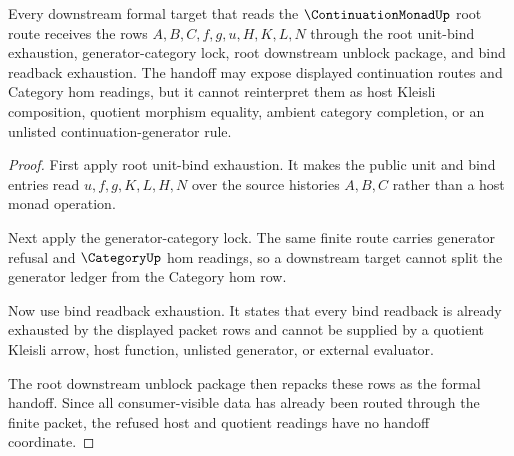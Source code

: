 \begin{theorem}
\label{thm:continuation-monad-root-route-formal-handoff}
Every downstream formal target that reads the $\ContinuationMonadUp$ root route receives the rows $A,B,C,f,g,u,H,K,L,N$ through the root unit-bind exhaustion, generator-category lock, root downstream unblock package, and bind readback exhaustion. The handoff may expose displayed continuation routes and Category hom readings, but it cannot reinterpret them as host Kleisli composition, quotient morphism equality, ambient category completion, or an unlisted continuation-generator rule.
\end{theorem}
\begin{proof}
First apply root unit-bind exhaustion. It makes the public unit and bind entries read $u,f,g,K,L,H,N$ over the source histories $A,B,C$ rather than a host monad operation.

Next apply the generator-category lock. The same finite route carries generator refusal and $\CategoryUp$ hom readings, so a downstream target cannot split the generator ledger from the Category hom row.

Now use bind readback exhaustion. It states that every bind readback is already exhausted by the displayed packet rows and cannot be supplied by a quotient Kleisli arrow, host function, unlisted generator, or external evaluator.

The root downstream unblock package then repacks these rows as the formal handoff. Since all consumer-visible data has already been routed through the finite packet, the refused host and quotient readings have no handoff coordinate.
\end{proof}


